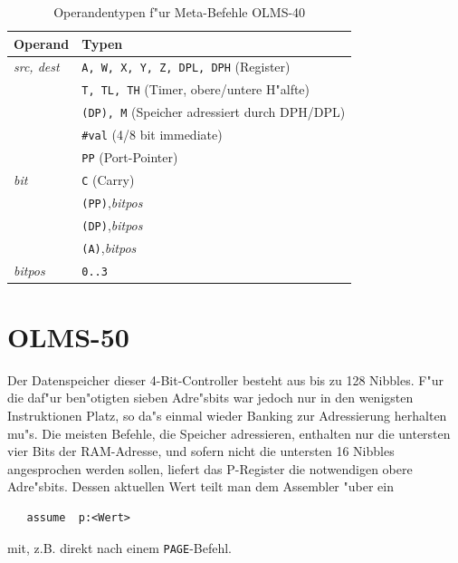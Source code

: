 \documentclass[12pt,a4paper,twoside]{report}
\newcommand{\tty}[1]{{\tt #1}}
\begin{document}
\begin{table}
\begin{center}\begin{tabular}{|l|l|}
\hline
Operand                 & Typen \\
\hline
{\em src, dest}         & \tty{A, W, X, Y, Z, DPL, DPH} (Register) \\
                        & \tty{T, TL, TH} (Timer, obere/untere H"alfte) \\
                        & \tty{(DP), M} (Speicher adressiert durch DPH/DPL) \\
                        & \tty{\#val} (4/8 bit immediate) \\
                        & \tty{PP} (Port-Pointer) \\
{\em bit}               & \tty{C} (Carry) \\
                        & \tty{(PP)},{\em bitpos} \\
                        & \tty{(DP)},{\em bitpos} \\
                        & \tty{(A)},{\em bitpos} \\
{\em bitpos}            & \tty{0..3} \\
\hline
\end{tabular}\end{center}
\caption{Operandentypen f"ur Meta-Befehle OLMS-40}
\label{TabOLMS40MetaOps}
\end{table}


\section{OLMS-50}

Der Datenspeicher dieser 4-Bit-Controller besteht aus bis zu 128
Nibbles.  F"ur die daf"ur ben"otigten sieben Adre"sbits war
jedoch nur in den wenigsten Instruktionen Platz, so da"s einmal
wieder Banking zur Adressierung herhalten mu"s.  Die meisten
Befehle, die Speicher adressieren, enthalten nur die untersten
vier Bits der RAM-Adresse, und sofern nicht die untersten 16
Nibbles angesprochen werden sollen, liefert das P-Register die
notwendigen obere Adre"sbits.  Dessen aktuellen Wert teilt man
dem Assembler "uber ein
\begin{verbatim}
   assume  p:<Wert>
\end{verbatim}
mit, z.B. direkt nach einem \tty{PAGE}-Befehl.
\end{document}
